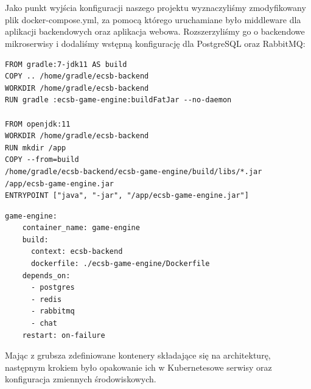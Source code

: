 \documentclass[polish]{aghengthesis}
\begin{document}
\chapter{\ChapterTitleEnvConfig}
\label{sec:konfiguracja-srodowiska}

Jako punkt wyjścia konfiguracji naszego projektu wyznaczyliśmy zmodyfikowany plik docker-compose.yml, za pomocą którego uruchamiane było middleware dla aplikacji backendowych oraz aplikacja webowa. Rozszerzyliśmy go o backendowe mikroserwisy i dodaliśmy wstępną konfigurację dla PostgreSQL oraz RabbitMQ: 
\\
\begin{lstlisting}[caption=Przykład pliku Dockerfile dla mikroserwisu]
FROM gradle:7-jdk11 AS build
COPY .. /home/gradle/ecsb-backend
WORKDIR /home/gradle/ecsb-backend
RUN gradle :ecsb-game-engine:buildFatJar --no-daemon

FROM openjdk:11
WORKDIR /home/gradle/ecsb-backend
RUN mkdir /app
COPY --from=build 
/home/gradle/ecsb-backend/ecsb-game-engine/build/libs/*.jar 
/app/ecsb-game-engine.jar
ENTRYPOINT ["java", "-jar", "/app/ecsb-game-engine.jar"]
\end{lstlisting}

\begin{lstlisting}[caption=Przykładowa definicja kontenera mikroserwisu w pliku docker-compose.yml]
game-engine:
    container_name: game-engine
    build:
      context: ecsb-backend
      dockerfile: ./ecsb-game-engine/Dockerfile
    depends_on:
      - postgres
      - redis
      - rabbitmq
      - chat
    restart: on-failure
\end{lstlisting}

Mając z grubsza zdefiniowane kontenery składające się na architekturę, następnym krokiem było opakowanie ich w Kubernetesowe serwisy oraz konfiguracja zmiennych środowiskowych.

\chapter{\ChapterTitleInstallMethod}
\label{sec:instalacja}


\chapter{\ChapterTitleSolutionSteps}
\label{sec:odtworzenie}
\end{document}
